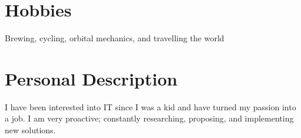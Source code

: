 \documentclass[]{template/friggeri-cv} %
\begin{document}

\section{Hobbies}

{Brewing, cycling, orbital mechanics, and travelling the world}

\section{Personal Description}
        {
          I have been interested into IT since I was a kid and have turned my passion into a job.
          I am very proactive; constantly researching, proposing, and implementing new solutions.
        }
\end{document}
